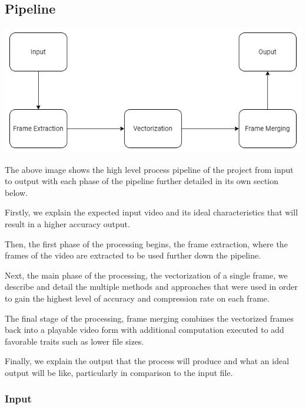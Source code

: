 \documentclass[12pt]{article}
\newcommand{\sentence}{} %
\begin{document}

    \subsection{Pipeline}\label{subsec:pipeline}

    \bigskip

    \includegraphics[width=\textwidth]{Pipeline.png}


    \bigskip

    The above image shows the high level process pipeline of the project from input to output with each phase of the
    pipeline further detailed in its own section below.
    \sentence
    Firstly, we explain the expected input video and its ideal characteristics that will result in a higher accuracy output.
    \sentence
    Then, the first phase of the processing begins, the frame extraction, where the frames of the video are
    extracted to be used further down the pipeline.
    \sentence
    Next, the main phase of the processing, the vectorization of a single frame, we describe and detail the multiple methods
    and approaches that were used in order to gain the highest level of accuracy and compression rate on each frame.
    \sentence
    The final stage of the processing, frame merging combines the vectorized frames back into a playable video form
    with additional computation executed to add favorable traits such as lower file sizes.
    \sentence
    Finally, we explain the output that the process will produce and what an ideal output will be like, particularly in
    comparison to the input file.

    \subsubsection{Input}\label{subsubsec:input}
\end{document}
